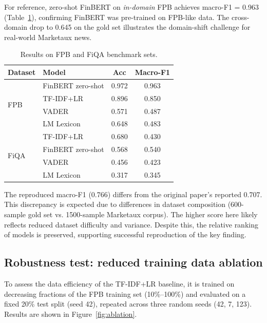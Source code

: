 \documentclass[11pt]{article}
\begin{document}
For reference, zero-shot FinBERT on \textit{in-domain} FPB achieves
macro-F1 = 0.963 (Table~\ref{tab:fpb_fiqa}), confirming FinBERT was
pre-trained on FPB-like data. The cross-domain drop to 0.645 on the gold set
illustrates the domain-shift challenge for real-world Marketaux news.

\begin{table}[h]
\centering
\small
\begin{tabular}{llcc}
\toprule
\textbf{Dataset} & \textbf{Model} & \textbf{Acc} & \textbf{Macro-F1} \\
\midrule
\multirow{4}{*}{FPB} & FinBERT zero-shot & 0.972 & 0.963 \\
                     & TF-IDF+LR        & 0.896 & 0.850 \\
                     & VADER            & 0.571 & 0.487 \\
                     & LM Lexicon       & 0.648 & 0.483 \\
\midrule
\multirow{4}{*}{FiQA} & TF-IDF+LR        & 0.680 & 0.430 \\
                      & FinBERT zero-shot & 0.568 & 0.540 \\
                      & VADER            & 0.456 & 0.423 \\
                      & LM Lexicon       & 0.317 & 0.345 \\
\bottomrule
\end{tabular}
\caption{Results on FPB and FiQA benchmark sets.}
\label{tab:fpb_fiqa}
\end{table}

The reproduced macro-F1 (0.766) differs from the original paper’s reported 0.707. 
This discrepancy is expected due to differences in dataset composition (600-sample gold set 
vs. 1500-sample Marketaux corpus). The higher score here likely reflects reduced dataset difficulty 
and variance. Despite this, the relative ranking of models is preserved, supporting successful 
reproduction of the key finding.

\subsection{Robustness test: reduced training data ablation}

To assess the data efficiency of the TF-IDF+LR baseline, it is trained on
decreasing fractions of the FPB training set (10\%--100\%) and evaluated on a
fixed 20\% test split (seed 42), repeated across three random seeds
(42, 7, 123). Results are shown in Figure~\ref{fig:ablation}.
\end{document}
